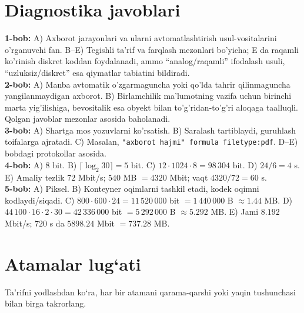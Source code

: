 \documentclass[11pt,a4paper,oneside]{book}
\newcommand{\chapterintro}[1]{\begin{tcolorbox}[colback=Navy,coltext=white,arc=2mm,boxrule=0pt]\sffamily #1\end{tcolorbox}}
\begin{document}
\chapter*{Diagnostika javoblari}
\small
\textbf{1-bob:} A) Axborot jarayonlari va ularni avtomatlashtirish usul-vositalarini o'rganuvchi fan. B--E) Tegishli ta'rif va farqlash mezonlari bo'yicha; E da raqamli ko'rinish diskret koddan foydalanadi, ammo ``analog/raqamli'' ifodalash usuli, ``uzluksiz/diskret'' esa qiymatlar tabiatini bildiradi.\\
\textbf{2-bob:} A) Manba avtomatik o'zgarmaguncha yoki qo'lda tahrir qilinmaguncha yangilanmaydigan axborot. B) Birlamchilik ma'lumotning vazifa uchun birinchi marta yig'ilishiga, bevositalik esa obyekt bilan to'g'ridan-to'g'ri aloqaga taalluqli. Qolgan javoblar mezonlar asosida baholanadi.\\
\textbf{3-bob:} A) Shartga mos yozuvlarni ko'rsatish. B) Saralash tartiblaydi, guruhlash toifalarga ajratadi. C) Masalan, \texttt{"axborot hajmi" formula filetype:pdf}. D--E) bobdagi protokollar asosida.\\
\textbf{4-bob:} A) 8 bit. B) $\lceil\log_2 30\rceil=5$ bit. C) $12\cdot1024\cdot8=98\,304$ bit. D) $24/6=4$ s. E) Amaliy tezlik $72$ Mbit/s; $540$ MB $=4320$ Mbit; vaqt $4320/72=60$ s.\\
\textbf{5-bob:} A) Piksel. B) Konteyner oqimlarni tashkil etadi, kodek oqimni kodlaydi/siqadi. C) $800\cdot600\cdot24=11\,520\,000$ bit $=1\,440\,000$ B $\approx1.44$ MB. D) $44\,100\cdot16\cdot2\cdot30=42\,336\,000$ bit $=5\,292\,000$ B $\approx5.292$ MB. E) Jami $8.192$ Mbit/s; $720$ s da $5898.24$ Mbit $=737.28$ MB.
\normalsize



\chapter{Atamalar lug‘ati}
\chapterintro{Ta’rifni yodlashdan ko‘ra, har bir atamani qarama-qarshi
yoki yaqin tushunchasi bilan birga takrorlang.}
\end{document}
